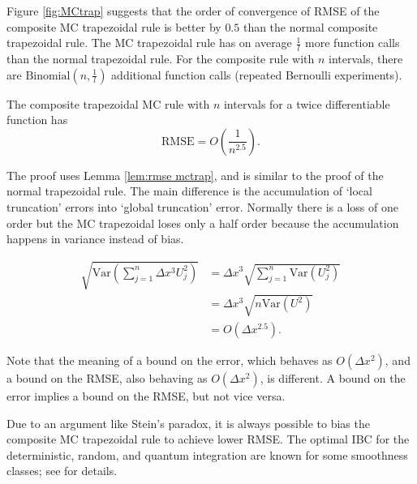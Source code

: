 \documentclass[a4paper,12pt]{article}
\begin{document}
Figure \ref{fig:MCtrap} suggests that the order of convergence of RMSE of the
composite MC trapezoidal rule is better by $0.5$ than the normal composite trapezoidal rule.
The MC trapezoidal rule has on average $\frac{1}{l}$ more function calls than
the normal trapezoidal rule. For the composite rule with $n$ intervals,
there are $\text{Binomial}(n,\frac{1}{l})$ additional function calls
(repeated Bernoulli experiments).\\

\begin{theorem} \label{thrm:order trap}
  The composite trapezoidal MC rule  with $n$ intervals
  for a twice differentiable function has
  \begin{equation}
    \text{RMSE} =O\left(\frac{1}{n^{2.5}} \right) .
  \end{equation}
\end{theorem}

The proof uses Lemma \ref{lem:rmse mctrap},
and is similar to the proof of the normal
trapezoidal rule. The main difference is the
accumulation of \enquote*{local truncation} errors into \enquote*{global truncation} error.
Normally there is a loss of one order but the MC trapezoidal loses only a half order
because the accumulation happens in variance instead of bias.

\begin{align}
  \sqrt{\text{Var}\left(\sum_{j=1}^{n}  \Delta x^{3}U_{j}^{2}\right)}
   & = \Delta x^{3} \sqrt{ \sum_{j=1}^{n}\text{Var} (U_{j}^{2})} \\
   & = \Delta x^{3} \sqrt{ n \text{Var}(U^{2})}                  \\
   & = O( \Delta x^{2.5}).
\end{align}

Note that the meaning of a bound on the error, which behaves as $O(\Delta x^{2})$,
and a bound on the RMSE, also behaving as $O(\Delta x^{2})$, is different.
A bound on the error implies a bound on the RMSE, but not vice versa.

\begin{related}
  Due to an argument like Stein's paradox,
  it is always possible to bias the composite MC trapezoidal
  rule to achieve lower RMSE.
  The optimal IBC for the deterministic, random, and quantum integration are known
  for some smoothness classes; see \cite{heinrich_optimal_2001} for details.
\end{related}
\end{document}
